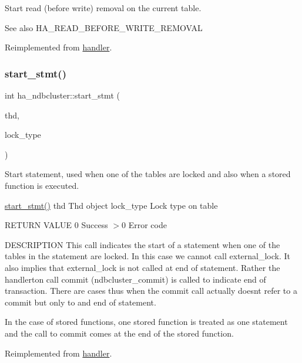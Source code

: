 Start read (before write) removal on the current table. \begin{DoxySeeAlso}{See also}
H\+A\+\_\+\+R\+E\+A\+D\+\_\+\+B\+E\+F\+O\+R\+E\+\_\+\+W\+R\+I\+T\+E\+\_\+\+R\+E\+M\+O\+V\+AL 
\end{DoxySeeAlso}


Reimplemented from \mbox{\hyperlink{classhandler_a3e2428788c2437e4e33c4b390cc697f7}{handler}}.

\mbox{\label{classha__ndbcluster_aa8f1c0c15ca6a002403699eec20f24e6}} 
\subsubsection{\texorpdfstring{start\+\_\+stmt()}{start\_stmt()}}
{\footnotesize\ttfamily int ha\+\_\+ndbcluster\+::start\+\_\+stmt (\begin{DoxyParamCaption}\item[{T\+HD $\ast$}]{thd,  }\item[{thr\+\_\+lock\+\_\+type}]{lock\+\_\+type }\end{DoxyParamCaption})\hspace{0.3cm}{\ttfamily [virtual]}}

Start statement, used when one of the tables are locked and also when a stored function is executed.

\mbox{\hyperlink{classha__ndbcluster_aa8f1c0c15ca6a002403699eec20f24e6}{start\+\_\+stmt()}} thd Thd object lock\+\_\+type Lock type on table

R\+E\+T\+U\+RN V\+A\+L\+UE 0 Success $>$0 Error code

D\+E\+S\+C\+R\+I\+P\+T\+I\+ON This call indicates the start of a statement when one of the tables in the statement are locked. In this case we cannot call external\+\_\+lock. It also implies that external\+\_\+lock is not called at end of statement. Rather the handlerton call commit (ndbcluster\+\_\+commit) is called to indicate end of transaction. There are cases thus when the commit call actually doesn\textquotesingle{}t refer to a commit but only to and end of statement.

In the case of stored functions, one stored function is treated as one statement and the call to commit comes at the end of the stored function. 

Reimplemented from \mbox{\hyperlink{classhandler}{handler}}.

